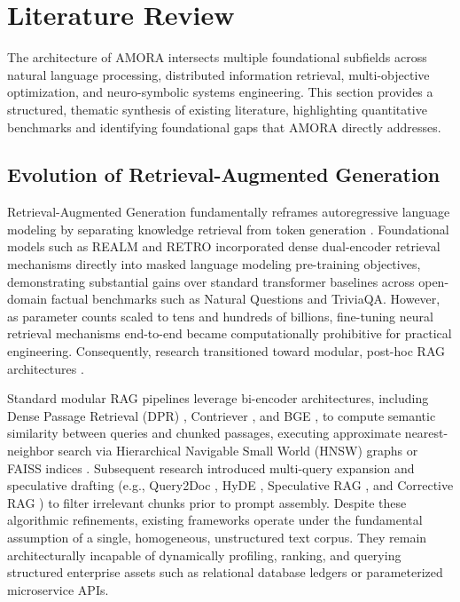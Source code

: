 \documentclass[conference,onecolumn,10pt]{IEEEtran}
\begin{document}
\section{Literature Review}
\label{sec:related_work}

The architecture of AMORA intersects multiple foundational subfields across natural language processing, distributed information retrieval, multi-objective optimization, and neuro-symbolic systems engineering. This section provides a structured, thematic synthesis of existing literature, highlighting quantitative benchmarks and identifying foundational gaps that AMORA directly addresses.

\subsection{Evolution of Retrieval-Augmented Generation}
Retrieval-Augmented Generation fundamentally reframes autoregressive language modeling by separating knowledge retrieval from token generation \cite{lewis2020rag}. Foundational models such as REALM \cite{guu2020realm} and RETRO \cite{borgeaud2022retro} incorporated dense dual-encoder retrieval mechanisms directly into masked language modeling pre-training objectives, demonstrating substantial gains over standard transformer baselines across open-domain factual benchmarks such as Natural Questions and TriviaQA. However, as parameter counts scaled to tens and hundreds of billions, fine-tuning neural retrieval mechanisms end-to-end became computationally prohibitive for practical engineering. Consequently, research transitioned toward modular, post-hoc RAG architectures \cite{gao2023rag_survey}.

Standard modular RAG pipelines leverage bi-encoder architectures, including Dense Passage Retrieval (DPR) \cite{karpukhin2020dpr}, Contriever \cite{izacard2021contriever}, and BGE \cite{xiao2023bge}, to compute semantic similarity between queries and chunked passages, executing approximate nearest-neighbor search via Hierarchical Navigable Small World (HNSW) graphs or FAISS indices \cite{malkov2018hnsw,johnson2019billion}. Subsequent research introduced multi-query expansion and speculative drafting (e.g., Query2Doc \cite{wang2023query2doc}, HyDE \cite{gao2022hyde}, Speculative RAG \cite{wang2024speculative}, and Corrective RAG \cite{yan2024crag}) to filter irrelevant chunks prior to prompt assembly. Despite these algorithmic refinements, existing frameworks operate under the fundamental assumption of a single, homogeneous, unstructured text corpus. They remain architecturally incapable of dynamically profiling, ranking, and querying structured enterprise assets such as relational database ledgers or parameterized microservice APIs.
\end{document}
